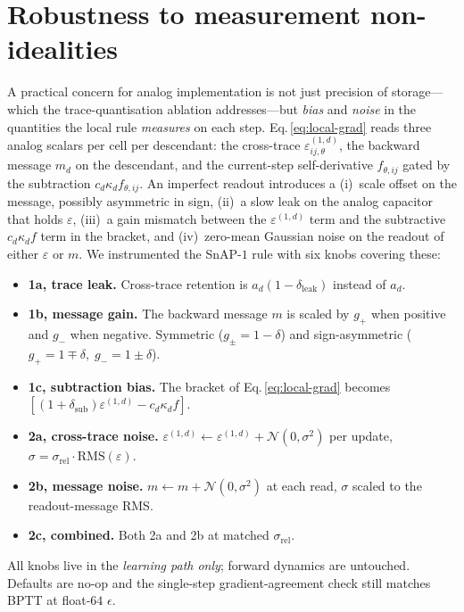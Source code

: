 \documentclass[11pt]{article}
\begin{document}
\section{Robustness to measurement non-idealities}
\label{sec:robustness}

A practical concern for analog implementation is not just precision of
storage---which the trace-quantisation ablation addresses---but
\emph{bias} and \emph{noise} in the quantities the local rule
\emph{measures} on each step.  Eq.\,\ref{eq:local-grad} reads three
analog scalars per cell per descendant: the cross-trace
$\varepsilon^{(1,d)}_{ij,\theta}$, the backward message $m_d$ on the
descendant, and the current-step self-derivative $f_{\theta,ij}$
gated by the subtraction $c_d\kappa_d f_{\theta,ij}$.  An imperfect
readout introduces a (i)~scale offset on the message, possibly
asymmetric in sign, (ii)~a slow leak on the analog capacitor that
holds $\varepsilon$, (iii)~a gain mismatch between the
$\varepsilon^{(1,d)}$ term and the subtractive $c_d\kappa_d f$ term in
the bracket, and (iv)~zero-mean Gaussian noise on the readout of
either $\varepsilon$ or $m$.  We instrumented the SnAP-$1$ rule with
six knobs covering these:

\begin{itemize}[leftmargin=*,itemsep=0pt]
\item \textbf{1a, trace leak.} Cross-trace retention is
  $a_d(1{-}\delta_{\text{leak}})$ instead of $a_d$.
\item \textbf{1b, message gain.} The backward message $m$ is scaled
  by $g_+$ when positive and $g_-$ when negative.  Symmetric
  ($g_\pm=1{-}\delta$) and sign-asymmetric ($g_+{=}1{\mp}\delta,\;g_-{=}1{\pm}\delta$).
\item \textbf{1c, subtraction bias.} The bracket of
  Eq.\,\ref{eq:local-grad} becomes
  $[(1{+}\delta_{\text{sub}})\varepsilon^{(1,d)} - c_d\kappa_d f]$.
\item \textbf{2a, cross-trace noise.}
  $\varepsilon^{(1,d)}\!\leftarrow\!\varepsilon^{(1,d)}+\mathcal N(0,\sigma^2)$ per update,
  $\sigma\!=\!\sigma_{\text{rel}}\cdot\mathrm{RMS}(\varepsilon)$.
\item \textbf{2b, message noise.}
  $m\!\leftarrow\!m+\mathcal N(0,\sigma^2)$ at each read,
  $\sigma$ scaled to the readout-message RMS.
\item \textbf{2c, combined.} Both 2a and 2b at matched $\sigma_{\text{rel}}$.
\end{itemize}
All knobs live in the \emph{learning path only}; forward dynamics are
untouched.  Defaults are no-op and the single-step gradient-agreement
check still matches BPTT at float-$64$ $\epsilon$.
\end{document}
